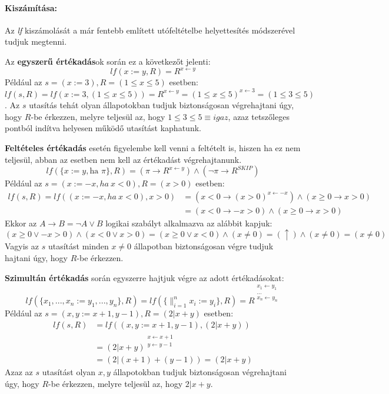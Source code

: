 \documentclass[12pt]{article}
\begin{document}
\paragraph{Kiszámítása:}
Az \textit{lf} kiszámolását a már fentebb említett utófeltételbe helyettesítés módszerével tudjuk megtenni.

Az \textbf{egyszerű értékadás}ok során ez a következőt jelenti:
$$lf(x := y, R) = R^{x \leftarrow y } $$
Például az $s = (x := 3), R = (1 \le x \le 5)$ esetben:\\
$lf(s, R) = lf(x:=3, (1 \le x \le 5)) = R^{x \leftarrow y} = (1 \le x \le 5)^{x \leftarrow 3} = (1 \le 3 \le 5)$.
Az $s$ utasítás tehát olyan állapotokban tudjuk biztonságosan végrehajtani úgy, hogy $R$-be érkezzen, melyre teljesül az, hogy $1 \le 3 \le 5 \equiv igaz$, azaz tetszőleges pontból indítva helyesen működő utasítást kaphatunk.

\textbf{Feltételes értékadás} esetén figyelembe kell venni a feltételt is, hiszen ha ez nem teljesül, abban az esetben nem kell az értékadást végrehajtanunk.
$$lf(\{x:=y, \text{ha } \pi\}, R) = (\pi \rightarrow R^{x \leftarrow y}) \land (\neg \pi \rightarrow R^{SKIP})$$
Például az $s = (x := -x, ha\ x < 0), R = (x > 0)$ esetben:
\begin{align*}
	lf(s, R) = lf((x := -x, ha\ x < 0), x > 0) &= (x < 0 \rightarrow (x > 0)^{x \leftarrow -x}) \land (x \ge 0 \rightarrow x > 0)\\
	&= (x < 0 \rightarrow -x > 0) \land (x \ge 0 \rightarrow x > 0)
\end{align*}
Ekkor az $A \rightarrow B = \neg A \lor B$ logikai szabályt alkalmazva az alábbit kapjuk:
$$ (x \ge 0 \lor -x > 0) \land (x < 0 \lor x > 0) = (x \ge 0 \lor x < 0) \land (x \neq 0) = (\uparrow) \land (x \neq 0) = (x \neq 0)$$
Vagyis az $s$ utasítást minden $x \neq 0$ állapotban biztonságosan végre tudjuk hajtani úgy, hogy $R$-be érkezzen.

\textbf{Szimultán értékadás} során egyszerre hajtjuk végre az adott értékadásokat:
$$lf(\{x_1, ..., x_n := y_1, ..., y_n\}, R) = lf(\{ \mathop{\parallel}_{i=1}^{n} x_i := y_i \}, R) = R^{\substack{ x_1 \leftarrow y_1 \\ ... \\ x_n \leftarrow y_n }}$$
Például az $s = (x,y := x + 1, y - 1), R = (2 | x + y)$ esetben:
\begin{align*}
	lf(s, R) &= lf((x,y := x + 1, y - 1), (2 | x + y)) \\
		&= (2 | x + y)^{\substack{ x \leftarrow x + 1 \\ y \leftarrow y - 1 }} \\
		&= (2 | (x + 1) + (y - 1)) = (2 | x + y)
\end{align*}
Azaz az $s$ utasítást olyan $x, y$ állapotokban tudjuk biztonságosan végrehajtani úgy, hogy $R$-be érkezzen, melyre teljesül az, hogy $2 | x + y$.
\end{document}
